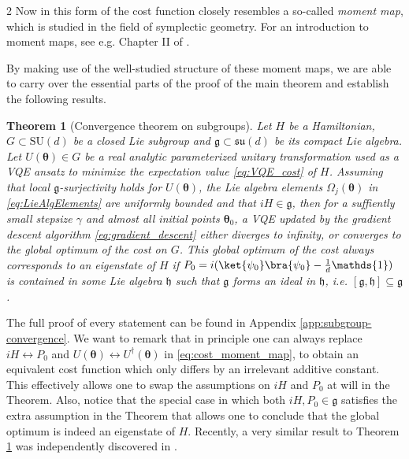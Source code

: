 \documentclass{article}
\renewcommand{\vec}[1]{\ensuremath{\boldsymbol{#1}}}
\newtheorem{theorem}{Theorem}
\begin{document}
\begin{multicols}{2}
Now in this form of the cost function closely resembles a so-called \textit{moment map}, which is studied in the field of symplectic geometry.
For an introduction to moment maps, see e.g. Chapter II of \cite{guillemin_symplectic_2001}.

By making use of the well-studied structure of these moment maps, we are able to carry over the essential parts of the proof of the main theorem and establish the following results.

\begin{theorem}[Convergence theorem on subgroups]
    \label{thm:subgroup_convergence}
    Let \(H\) be a Hamiltonian, \(G \subset \mathrm{SU}(d)\) be a closed Lie subgroup and \(\mathfrak{g} \subset \mathfrak{su}(d)\) be its compact Lie algebra.
    Let $U(\vec{\theta})\in G$ be a real analytic parameterized unitary transformation used as a VQE ansatz to minimize the expectation value \eqref{eq:VQE_cost} of $H$.
    Assuming that local \(\mathfrak{g}\)-surjectivity holds for $U(\vec{\theta})$, the Lie algebra elements $\Omega_j(\vec{\theta})$ in \eqref{eq:LieAlgElements} are uniformly bounded and that \(iH \in \mathfrak{g}\), then for a suffiently small stepsize $\gamma$ and almost all initial points \(\vec{\theta}_0\), a VQE updated by the gradient descent algorithm \eqref{eq:gradient_descent} either diverges to infinity, or converges to the global optimum of the cost on \(G\).
    This global optimum of the cost always corresponds to an eigenstate of \(H\) if \(P_0 = i(\ket{\psi_0}\bra{\psi_0}- \frac{1}{d}\mathds{1})\) is contained in some Lie algebra \(\mathfrak{h}\) such that \(\mathfrak{g}\) forms an ideal in \(\mathfrak{h}\), i.e. \([\mathfrak{g}, \mathfrak{h}] \subseteq \mathfrak{g}\).
\end{theorem}

The full proof of every statement can be found in Appendix \ref{app:subgroup-convergence}.
We want to remark that in principle one can always replace \(iH \leftrightarrow P_0\) and \(U(\vec{\theta}) \leftrightarrow U^\dagger(\vec{\theta})\) in \eqref{eq:cost_moment_map}, to obtain an equivalent cost function which only differs by an irrelevant additive constant.
This effectively allows one to swap the assumptions on \(iH\) and \(P_0\) at will in the Theorem.
Also, notice that the special case in which both \(iH, P_0 \in \mathfrak{g}\) satisfies the extra assumption in the Theorem that allows one to conclude that the global optimum is indeed an eigenstate of \(H\).
Recently, a very similar result to Theorem \ref{thm:subgroup_convergence} was independently discovered in \cite{chen_quantum_2026}.


\end{multicols}
\end{document}
